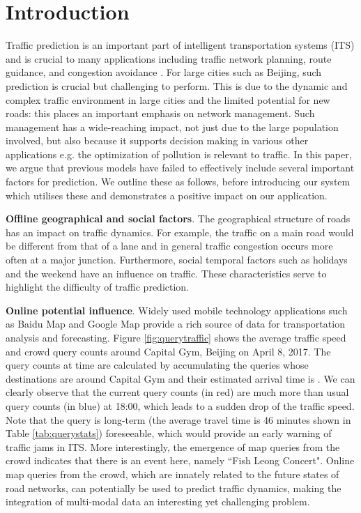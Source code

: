 \section{Introduction}
Traffic prediction is an important part of intelligent transportation systems (ITS) and is crucial to many applications including traffic network planning, route guidance, and congestion avoidance \cite{zhang2011data}. For large cities such as Beijing, such prediction is crucial but challenging to perform. This is due to the dynamic and complex traffic environment in large cities and the limited potential for new roads: this places an important emphasis on network management. Such management has a wide-reaching impact, not just due to the large population involved, but also because it supports decision making in various other applications e.g. the optimization of pollution is relevant to traffic. In this paper, we argue that previous models have failed to effectively include several important factors for prediction. We outline these as follows, before introducing our system which utilises these and demonstrates a positive impact on our application.

\textbf{Offline geographical and social factors}. The geographical structure of roads has an impact on traffic dynamics. For example, the traffic on a main road would be different from that of a lane and in general traffic congestion occurs more often at a major junction. Furthermore, social temporal factors such as holidays and the weekend have an influence on traffic. These characteristics serve to highlight the difficulty of traffic prediction. 

\textbf{Online potential influence}. Widely used mobile technology applications such as Baidu Map and Google Map provide a rich source of data for transportation analysis and forecasting. Figure \ref{fig:querytraffic} shows the average traffic speed and crowd query counts around Capital Gym, Beijing on April 8, 2017. The query counts at time  are calculated by accumulating the queries whose destinations are around Capital Gym and their estimated arrival time is . We can clearly observe that the current query counts (in red) are much more than usual query counts (in blue) at 18:00, which leads to a sudden drop of the traffic speed. Note that the query is long-term (the average travel time is 46 minutes shown in Table \ref{tab:querystats}) foreseeable, which would provide an early warning of traffic jams in ITS. More interestingly, the emergence of map queries from the crowd indicates that there is an event here, namely ``Fish Leong Concert". Online map queries from the crowd, which are innately related to the future states of road networks, can potentially be used to predict traffic dynamics, making the integration of multi-modal data an interesting yet challenging problem. 


